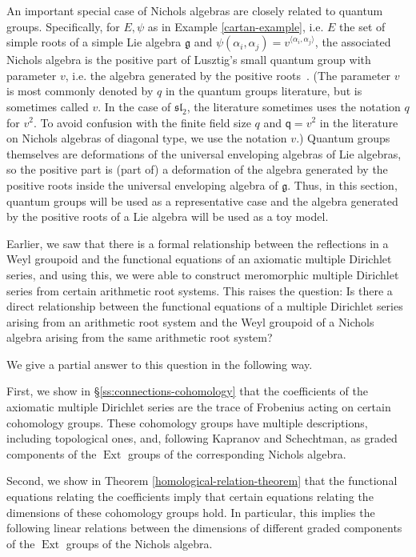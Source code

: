 \documentclass[11pt,letterpaper]{article}
\theoremstyle{definition}
\theoremstyle{remark}
\numberwithin{equation}{section}
\theoremstyle{dotless}
\newcommand{\hchi}{\psi} %
\newcommand{\qq}{\mathbf{ \mathsf{q}}} %
\newcommand{\qv}{v}
\newcommand{\Ext}{\operatorname{Ext}}
\begin{document}
An important special case of Nichols algebras are closely related to quantum groups. Specifically, for $E, \hchi$ as in Example \ref{cartan-example}, i.e. $E$ the set of simple roots of a simple Lie algebra $\mathfrak g$ and $\hchi ( \alpha_i,\alpha_j) = v^{\langle \alpha_i,\alpha_j \rangle}$, the associated Nichols algebra is the positive part of Lusztig's small quantum group with parameter $\qv$, i.e. the algebra generated by the positive roots~\cite[Theorem 15.2]{Rosso1998}. (The parameter $\qv$ is most commonly denoted by $q$ in the quantum groups literature, but is sometimes called $\qv$. In the case of $\mathfrak{sl}_2$, the literature sometimes uses the notation $q$ for $\qv^2$. To avoid confusion with the finite field size $q$ and $\qq=\qv^2$ in the literature on Nichols algebras of diagonal type, we use the notation $\qv$.) Quantum groups themselves are deformations of the universal enveloping algebras of Lie algebras, so the positive part is (part of) a deformation of the algebra generated by the positive roots inside the universal enveloping algebra of $\mathfrak g$. Thus, in this section, quantum groups will be used as a representative case and the algebra generated by the positive roots of a Lie algebra will be used as a toy model.

Earlier, we saw that there is a formal relationship between the reflections in a Weyl groupoid and the functional equations of an axiomatic multiple Dirichlet series, and using this, we were able to construct meromorphic multiple Dirichlet series from certain arithmetic root systems. This raises the question: Is there a direct relationship between the functional equations of a multiple Dirichlet series arising from an arithmetic root system and the Weyl groupoid of a Nichols algebra arising from the same arithmetic root system?

We give a partial answer to this question in the following way.

First, we show in \S\ref{ss:connections-cohomology} that the coefficients of the axiomatic multiple Dirichlet series are the trace of Frobenius acting on certain cohomology groups. These cohomology groups have multiple descriptions, including topological ones, and, following Kapranov and Schechtman, as graded components of the $\Ext$ groups of the corresponding Nichols algebra.

Second, we show in Theorem \ref{homological-relation-theorem} that the functional equations relating the coefficients imply that certain equations relating the dimensions of these cohomology groups hold. In particular, this implies the following linear relations between the dimensions of different graded components of the $\Ext$ groups of the Nichols algebra.
\end{document}
